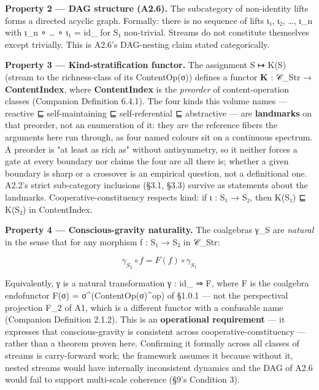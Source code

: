 \documentclass[11pt, openany]{book}
\begin{document}
\textbf{Property 2 --- DAG structure (A2.6).} The subcategory of non-identity lifts forms a directed acyclic graph. Formally: there is no sequence of lifts ι₁, ι₂, …, ι\_\allowbreak{}n with ι\_\allowbreak{}n ∘ … ∘ ι₁ = id\_ for S₁ non-trivial. Streams do not constitute themselves except trivially. This is A2.6's DAG-nesting claim stated categorically.

\textbf{Property 3 --- Kind-stratification functor.} The assignment S ↦ K(S) (stream to the richness-class of its ContentOp(σ)) defines a functor \textbf{K} : 𝒞\_\allowbreak{}Str → \textbf{ContentIndex}, where \textbf{ContentIndex} is the \textit{preorder} of content-operation classes (Companion Definition 6.4.1). The four kinds this volume names --- reactive ⊑ self-maintaining ⊑ self-referential ⊑ abstractive --- are \textbf{landmarks} on that preorder, not an enumeration of it: they are the reference fibers the arguments here run through, as four named colours sit on a continuous spectrum. A preorder is "at least as rich as" without antisymmetry, so it neither forces a gate at every boundary nor claims the four are all there is; whether a given boundary is sharp or a crossover is an empirical question, not a definitional one. A2.2's strict sub-category inclusions (§3.1, §3.3) survive as statements about the landmarks. Cooperative-constituency respects kind: if ι : S₁ → S₂, then K(S₁) ⊑ K(S₂) in ContentIndex.

\textbf{Property 4 --- Conscious-gravity naturality.} The coalgebras γ\_\allowbreak{}S are \textit{natural} in the sense that for any morphism f : S₁ → S₂ in 𝒞\_\allowbreak{}Str:

$$\gamma_{S_2} \circ f = F(f) \circ \gamma_{S_1}$$

Equivalently, γ is a natural transformation γ : id\_ ⇒ F, where F is the coalgebra endofunctor F(σ) = σ\textasciicircum{}(ContentOp(σ)\textasciicircum{}op) of §1.0.1 --- not the perspectival projection F\_\allowbreak{}2 of A1, which is a different functor with a confusable name (Companion Definition 2.1.2). This is an \textbf{operational requirement} --- it expresses that conscious-gravity is consistent across cooperative-constituency --- rather than a theorem proven here. Confirming it formally across all classes of streams is carry-forward work; the framework assumes it because without it, nested streams would have internally inconsistent dynamics and the DAG of A2.6 would fail to support multi-scale coherence (§9's Condition 3).
\end{document}
